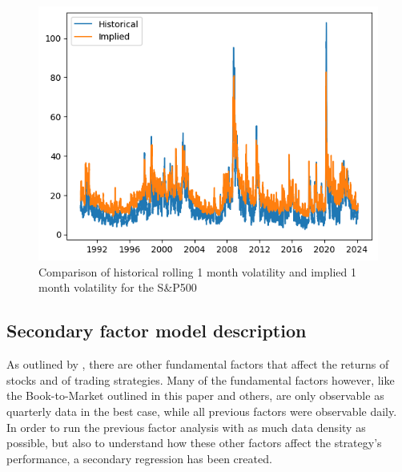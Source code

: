 \begin{figure}[ht]
    \captionsetup{justification=centering}
    \includegraphics[width=\linewidth]{assets/hist-vs-impl-vol.png}
    \caption{Comparison of historical rolling 1 month volatility and implied 1 month volatility for the S\&P500}
    \label{fig:hist-vs-impl-vol}
\end{figure}

\subsection{Secondary factor model description}
As outlined by \cite{fama_french_1995}, there are other fundamental factors that affect the returns of stocks and of trading strategies. Many of the fundamental factors however, like the Book-to-Market outlined in this paper and others, are only observable as quarterly data in the best case, while all previous factors were observable daily. In order to run the previous factor analysis with as much data density as possible, but also to understand how these other factors affect the strategy's performance, a secondary regression has been created. 

